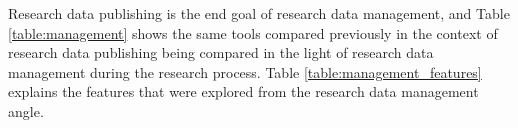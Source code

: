 Research data publishing is the end goal of research data management, and
Table \ref{table:management} shows the same tools compared previously in
the context of research data publishing being compared in the light
of research data management during the research process. Table
\ref{table:management_features} explains the features that were
explored from the research data management angle.

